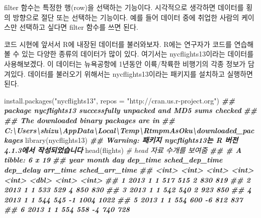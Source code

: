 \documentclass[
]{book}
\newenvironment{Shaded}{\begin{snugshade}}{\end{snugshade}}
\newcommand{\AttributeTok}[1]{\textcolor[rgb]{0.77,0.63,0.00}{#1}}
\newcommand{\CommentTok}[1]{\textcolor[rgb]{0.56,0.35,0.01}{\textit{#1}}}
\newcommand{\DocumentationTok}[1]{\textcolor[rgb]{0.56,0.35,0.01}{\textbf{\textit{#1}}}}
\newcommand{\FunctionTok}[1]{\textcolor[rgb]{0.00,0.00,0.00}{#1}}
\newcommand{\NormalTok}[1]{#1}
\newcommand{\StringTok}[1]{\textcolor[rgb]{0.31,0.60,0.02}{#1}}
\theoremstyle{definition}
\theoremstyle{definition}
\theoremstyle{definition}
\theoremstyle{definition}
\theoremstyle{remark}
\begin{document}
filter 함수는 특정한 행(row)을 선택하는 기능이다. 시각적으로 생각하면 데이터를 횡의 방향으로 절단 또는 선택하는 기능이다. 예를 들어 데이터 중에 취업한 사람의 케이스만 선택하고 싶다면 filter 함수를 쓰면 된다.

코드 시현에 앞서서 R에 내장된 데이터를 불러와보자. R에는 연구자가 코드를 연습해볼 수 있는 다양한 종류의 데이터가 많이 있다. 여기서는 nycflights13이라는 데이터를 사용해보겠다. 이 데이터는 뉴욕공항에 1년동안 이륙/착륙한 비행기의 각종 정보가 담겨있다. 데이터를 불러오기 위해서는 nycflights13이라는 패키지를 설치하고 실행하면 된다.

\begin{Shaded}
\begin{Highlighting}[]
\FunctionTok{install.packages}\NormalTok{(}\StringTok{"nycflights13"}\NormalTok{, }\AttributeTok{repos =} \StringTok{"http://cran.us.r{-}project.org"}\NormalTok{)}
\DocumentationTok{\#\# package \textquotesingle{}nycflights13\textquotesingle{} successfully unpacked and MD5 sums checked}
\DocumentationTok{\#\# }
\DocumentationTok{\#\# The downloaded binary packages are in}
\DocumentationTok{\#\#  C:\textbackslash{}Users\textbackslash{}shizu\textbackslash{}AppData\textbackslash{}Local\textbackslash{}Temp\textbackslash{}RtmpmAsOku\textbackslash{}downloaded\_packages}
\FunctionTok{library}\NormalTok{(nycflights13)}
\DocumentationTok{\#\# Warning: 패키지 \textquotesingle{}nycflights13\textquotesingle{}는 R 버전 4.1.3에서 작성되었습니다}
\FunctionTok{head}\NormalTok{(flights) }\CommentTok{\# head 자료 수개를 보여줌}
\DocumentationTok{\#\# \# A tibble: 6 x 19}
\DocumentationTok{\#\#    year month   day dep\_time sched\_dep\_time dep\_delay arr\_time sched\_arr\_time}
\DocumentationTok{\#\#   \textless{}int\textgreater{} \textless{}int\textgreater{} \textless{}int\textgreater{}    \textless{}int\textgreater{}          \textless{}int\textgreater{}     \textless{}dbl\textgreater{}    \textless{}int\textgreater{}          \textless{}int\textgreater{}}
\DocumentationTok{\#\# 1  2013     1     1      517            515         2      830            819}
\DocumentationTok{\#\# 2  2013     1     1      533            529         4      850            830}
\DocumentationTok{\#\# 3  2013     1     1      542            540         2      923            850}
\DocumentationTok{\#\# 4  2013     1     1      544            545        {-}1     1004           1022}
\DocumentationTok{\#\# 5  2013     1     1      554            600        {-}6      812            837}
\DocumentationTok{\#\# 6  2013     1     1      554            558        {-}4      740            728}

\end{Highlighting}
\end{Shaded}
\end{document}
